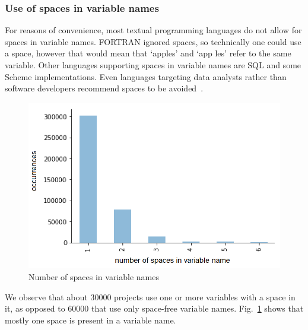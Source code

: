 \documentclass[conference]{IEEEtran}
\begin{document}
\subsubsection{Use of spaces in variable names}
For reasons of convenience, most textual programming languages do not allow for spaces in variable names. 
FORTRAN ignored spaces, so technically one could use a space, however that would mean that `apples' and `app les' refer to the same variable. 
Other languages supporting spaces in variable names are SQL and some Scheme implementations. 
Even languages targeting data analysts rather than software developers recommend spaces to be avoided~\cite{Bochud}.
\begin{figure}
	\begin{center}
		\includegraphics[width=\columnwidth]{fig/spaces_varname_occurrences}
		\caption{Number of spaces in variable names}
		\label{fig:number_of_spaces}
	\end{center}
\end{figure} 

We observe that about 30000 projects use one or more variables with a space in it, as opposed to 60000 that use only space-free variable names. 
Fig.~\ref{fig:number_of_spaces} shows that mostly one space is present in a variable name. 
\end{document}
